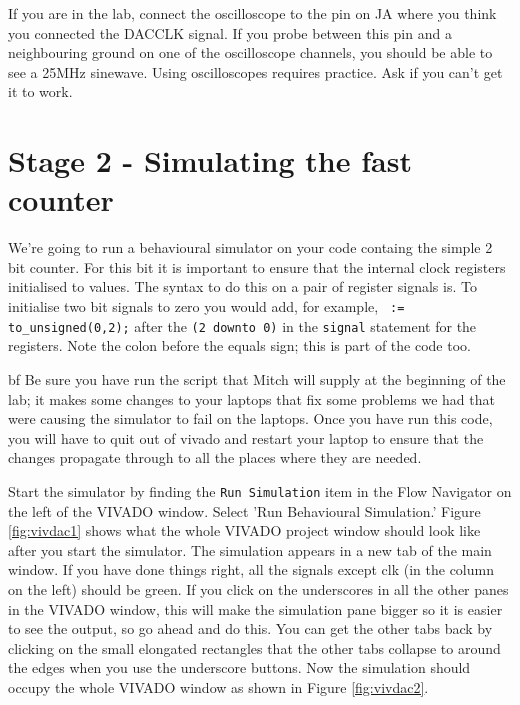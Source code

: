 \documentclass[../physical_computing.tex]{subfiles}
\begin{document}
If you are in the lab, connect the oscilloscope to the pin on JA where you think you connected the DACCLK signal. If you probe between this pin and a neighbouring ground on one of the oscilloscope channels, you should be able to see a 25MHz sinewave. Using oscilloscopes requires practice. Ask if you can't get it to work.

\section{Stage 2 - Simulating the fast counter}
\label{sec:simulator1}

We're going to run a behavioural simulator on your code containg the simple 2 bit counter. For this bit it is important to ensure that the internal clock registers initialised to values. The syntax to do this on a pair of register signals is. To initialise two bit signals to zero you would add, for example, \texttt{ := to\_unsigned(0,2);} after the
\texttt{(2 downto 0)} in the \texttt{signal} statement for the registers. Note the colon before the equals sign; this is part of the code too.

{bf Be sure you have run the script that Mitch will supply at the beginning of the lab; it makes some changes to your laptops that fix some problems we had that were causing the simulator to fail on the laptops. Once you have run this code, you will have to quit out of vivado and restart your laptop to ensure that the changes propagate through to all the places where they are needed.}

Start the simulator by finding the \texttt{Run Simulation} item in the Flow Navigator on the left of the VIVADO window. Select 'Run Behavioural Simulation.' Figure \ref{fig:vivdac1} shows what the whole VIVADO project window should look like after you start the simulator. The simulation appears in a new tab of the main window. If you have done things right, all the signals except clk (in the column on the left) should be green. If you click on the underscores in all the other panes in the VIVADO window, this will make the simulation pane bigger so it is easier to see the output, so go ahead and do this. You can get the other tabs back by clicking on the small elongated rectangles that the other tabs collapse to around the edges when you use the underscore buttons. Now the simulation should occupy the whole VIVADO window as shown in Figure \ref{fig:vivdac2}. 
\end{document}
